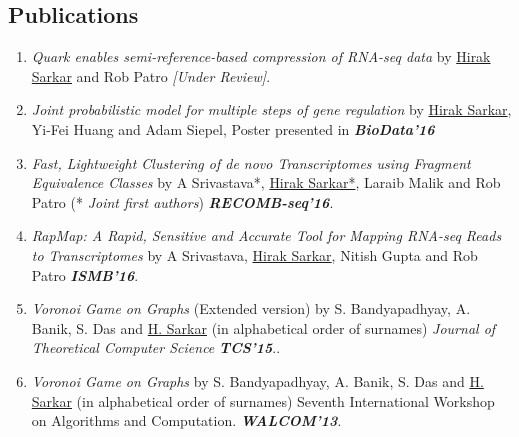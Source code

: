 \documentclass{res}
\begin{document}
\begin{resume}
\section{Publications}
\begin{enumerate}
\item   {\it Quark enables semi-reference-based compression of RNA-seq data} by  \underline{Hirak Sarkar} and Rob Patro {\em [Under Review]}.

\item {\it Joint probabilistic model for multiple steps of gene regulation} by \underline{Hirak Sarkar}, Yi-Fei Huang and Adam Siepel, Poster presented in  \textit{\textbf{BioData'16}}

\item   {\it Fast, Lightweight Clustering of de novo Transcriptomes using Fragment Equivalence Classes} by A Srivastava*, \underline{Hirak Sarkar*}, Laraib Malik and Rob Patro (* \textit{Joint first authors}) \textit{\textbf{RECOMB-seq'16}}. 


\item {\it RapMap: A Rapid, Sensitive and Accurate Tool for Mapping RNA-seq Reads to Transcriptomes} by A Srivastava, \underline{Hirak Sarkar}, Nitish Gupta and Rob Patro  \textit{\textbf{ISMB'16}}.

\item {\it Voronoi Game on Graphs} (Extended version) by S. Bandyapadhyay, A. Banik, S. Das and \underline{H. Sarkar} (in alphabetical order of surnames) {\it Journal of Theoretical Computer Science}  \textit{\textbf{TCS'15}}..

\item {\it Voronoi Game on Graphs} by  S. Bandyapadhyay, A. Banik, S. Das and \underline{H. Sarkar} (in alphabetical order of surnames) Seventh International Workshop on Algorithms and Computation. \textit{\textbf{WALCOM'13}}.
\end{enumerate}


\end{resume}
\end{document}
